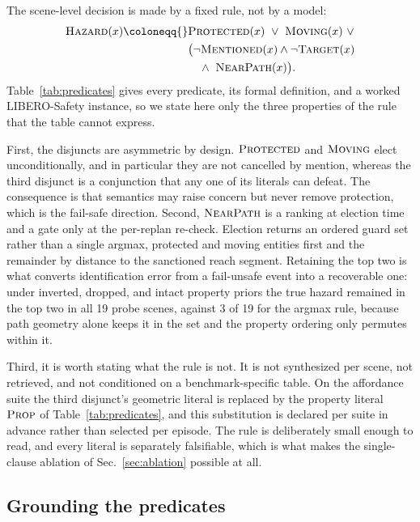 The scene-level decision is made by a fixed rule, not by a model:
\begin{equation}
\begin{aligned}
\textsc{Hazard}(x) \coloneqq{}& \textsc{Protected}(x)\ \vee\ \textsc{Moving}(x)\ \vee \\
&\big(\lnot\textsc{Mentioned}(x)\wedge\lnot\textsc{Target}(x) \\
&\quad\wedge\ \textsc{NearPath}(x)\big).
\end{aligned}
\label{eq:fol}
\end{equation}
Table~\ref{tab:predicates} gives every predicate, its formal definition, and a
worked LIBERO-Safety instance, so we state here only the three properties of the
rule that the table cannot express.

First, the disjuncts are asymmetric by design. $\textsc{Protected}$ and
$\textsc{Moving}$ elect unconditionally, and in particular they are not
cancelled by mention, whereas the third disjunct is a conjunction that any one
of its literals can defeat. The consequence is that semantics may raise concern
but never remove protection, which is the fail-safe direction. Second,
$\textsc{NearPath}$ is a ranking at election time and a gate only at the
per-replan re-check. Election returns an ordered guard set rather than a single
argmax, protected and moving entities first and the remainder by distance to the
sanctioned reach segment. Retaining the top two is what converts identification
error from a fail-unsafe event into a recoverable one: under inverted, dropped,
and intact property priors the true hazard remained in the top two in all 19
probe scenes, against 3 of 19 for the argmax rule, because path geometry alone
keeps it in the set and the property ordering only permutes within it.

Third, it is worth stating what the rule is not. It is not synthesized per
scene, not retrieved, and not conditioned on a benchmark-specific table. On the
affordance suite the third disjunct's geometric literal is replaced by the
property literal $\textsc{Prop}$ of Table~\ref{tab:predicates}, and this
substitution is declared per suite in advance rather than selected per episode.
The rule is deliberately small enough to read, and every literal is separately
falsifiable, which is what makes the single-clause ablation of
Sec.~\ref{sec:ablation} possible at all.

\subsection{Grounding the predicates}
\label{sec:ground}

